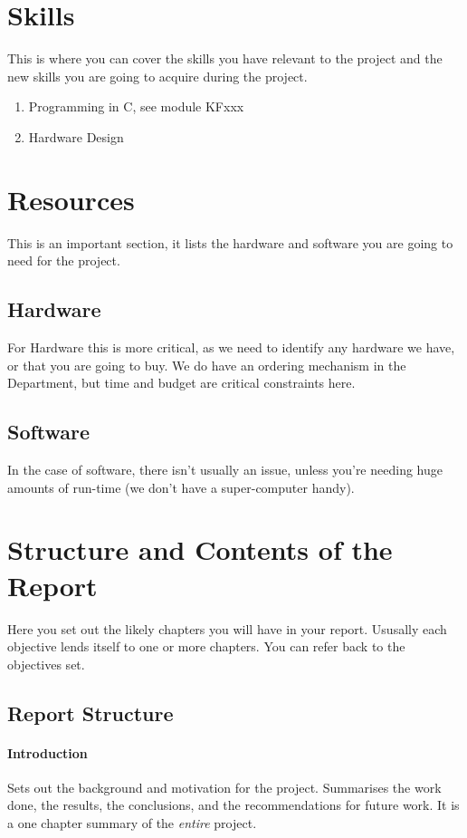 \section{Skills}
This is where you can cover the skills you have relevant to the project and the new skills you are going to acquire during the project.
\begin{enumerate}
	\item Programming in C, see module KFxxx
	\item Hardware Design
\end{enumerate}

\section{Resources}
This is an important section, it lists the hardware and software you are going to need for the project.

\subsection{Hardware}
For Hardware this is more critical, as we need to identify any hardware we have, or that you are going to buy.  We do have an ordering mechanism in the Department, but time and budget are critical constraints here.

\subsection{Software}
In the case of software, there isn't usually an issue, unless you're needing huge amounts of run-time (we don't have a super-computer handy).

\section{Structure and Contents of the Report}
Here you set out the likely chapters you will have in your report.  Ususally each objective lends itself to one or more chapters.  You can refer back to the objectives set.
\subsection{Report Structure}

\paragraph{Introduction}  Sets out the background and motivation for the project.  Summarises the work done, the results, the conclusions, and the recommendations for future work.  It is a one chapter summary of the \emph{entire} project.

